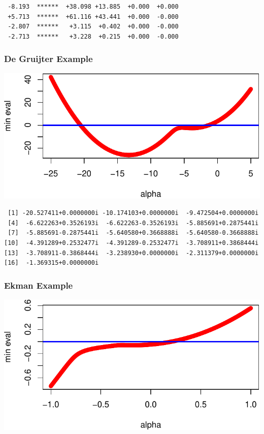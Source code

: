 \documentclass[
  12pt,
  letterpaper,
  DIV=11,
  numbers=noendperiod]{scrreprt}
\theoremstyle{remark}
\begin{document}
\begin{verbatim}
 -8.193  ******  +38.098 +13.885  +0.000  +0.000 
 +5.713  ******  +61.116 +43.441  +0.000  -0.000 
 -2.807  ******   +3.115  +0.402  +0.000  -0.000 
 -2.713  ******   +3.228  +0.215  +0.000  -0.000 
\end{verbatim}

\subsubsection{De Gruijter Example}\label{de-gruijter-example}

\includegraphics{interval_files/figure-pdf/gruadd-1.pdf}

\begin{verbatim}
 [1] -20.527411+0.0000000i -10.174103+0.0000000i  -9.472504+0.0000000i
 [4]  -6.622263+0.3526193i  -6.622263-0.3526193i  -5.885691+0.2875441i
 [7]  -5.885691-0.2875441i  -5.640580+0.3668888i  -5.640580-0.3668888i
[10]  -4.391289+0.2532477i  -4.391289-0.2532477i  -3.708911+0.3868444i
[13]  -3.708911-0.3868444i  -3.238930+0.0000000i  -2.311379+0.0000000i
[16]  -1.369315+0.0000000i
\end{verbatim}

\subsubsection{Ekman Example}\label{ekman-example}

\includegraphics{interval_files/figure-pdf/ekkadd-1.pdf}
\end{document}

